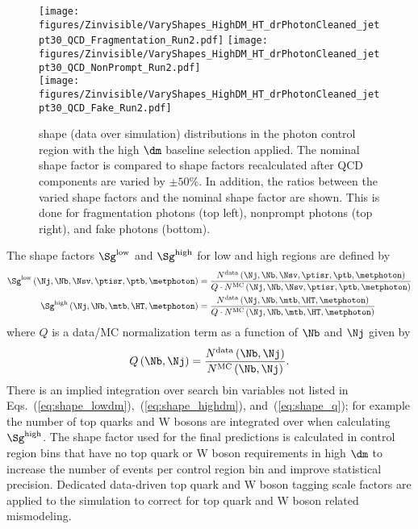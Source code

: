 \begin{figure}[tbp]
{
\centering
\texttt{[image: figures/Zinvisible/VaryShapes\_HighDM\_HT\_drPhotonCleaned\_jetpt30\_QCD\_Fragmentation\_Run2.pdf]}
\texttt{[image: figures/Zinvisible/VaryShapes\_HighDM\_HT\_drPhotonCleaned\_jetpt30\_QCD\_NonPrompt\_Run2.pdf]}\\
\texttt{[image: figures/Zinvisible/VaryShapes\_HighDM\_HT\_drPhotonCleaned\_jetpt30\_QCD\_Fake\_Run2.pdf]}
\caption[\HT shape distributions in the photon control region with the high $\dm$ baseline selection applied]
{
    \HT shape (data over simulation) distributions in the photon control region with the high $\dm$ baseline selection applied.
    The nominal shape factor is compared to shape factors recalculated after QCD components are varied by $\pm 50\%$.
    In addition, the ratios between the varied shape factors and the nominal shape factor are shown.
    This is done for fragmentation photons (top left), nonprompt photons (top right), and fake photons (bottom).
}
\label{fig:photon_ht_vary}
}
\end{figure}


The shape factors $\Sg^{\mathrm{low}}$ and $\Sg^{\mathrm{high}}$ for low \dm and high \dm regions are defined by
\begin{align}
\label{eq:shape_lowdm}
\Sg^{\mathrm{low}}\left(\Nj, \Nb, \Nsv, \ptisr, \ptb, \metphoton\right) &= \frac{N^{\mathrm{data}}\left(\Nj, \Nb, \Nsv, \ptisr, \ptb, \metphoton\right)}{Q \cdot N^{\mathrm{MC}}\left(\Nj, \Nb, \Nsv, \ptisr, \ptb, \metphoton\right)} \\
\label{eq:shape_highdm}
\Sg^{\mathrm{high}}\left(\Nj, \Nb, \mtb, \HT, \metphoton\right) &= \frac{N^{\mathrm{data}}\left(\Nj, \Nb, \mtb, \HT, \metphoton\right)}{Q \cdot N^{\mathrm{MC}}\left(\Nj, \Nb, \mtb, \HT, \metphoton\right)}
\end{align}
where $Q$ is a data/MC normalization term as a function of $\Nb$ and $\Nj$ given by
\begin{align}
\label{eq:shape_q}
Q\left(\Nb, \Nj\right) = \frac{N^{\mathrm{data}}\left(\Nb, \Nj\right)}{N^{\mathrm{MC}}\left(\Nb, \Nj\right)}.
\end{align}
There is an implied integration over search bin variables not listed in Eqs.~(\ref{eq:shape_lowdm}),~(\ref{eq:shape_highdm}), and~(\ref{eq:shape_q}); for example the number of top quarks and W bosons are integrated over when calculating $\Sg^{\mathrm{high}}$.
The shape factor used for the final predictions is calculated in control region bins that have no top quark or W boson requirements in high $\dm$ to increase the number of events per control region bin and improve statistical precision.
Dedicated data-driven top quark and W boson tagging scale factors are applied to the \znunu simulation to correct for top quark and W boson related mismodeling.

